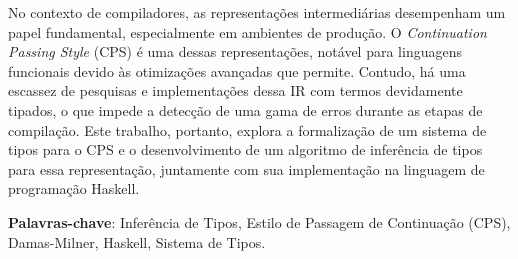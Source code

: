 
\setlength{\absparsep}{18pt}    %
\begin{resumo}
  No contexto de compiladores, as representações intermediárias desempenham um papel fundamental, especialmente em ambientes de produção.
  O \textit{Continuation Passing Style} (CPS) é uma dessas representações, notável para linguagens funcionais devido às otimizações avançadas que permite.
  Contudo, há uma escassez de pesquisas e implementações dessa IR com termos devidamente tipados, o que impede a detecção de uma gama de erros durante as etapas de compilação.
  Este trabalho, portanto, explora a formalização de um sistema de tipos para o CPS e o desenvolvimento de um algoritmo de inferência de tipos para essa representação, juntamente com sua implementação na linguagem de programação Haskell. 
  
  \textbf{Palavras-chave}: Inferência de Tipos, Estilo de Passagem de Continuação (CPS), Damas-Milner, Haskell, Sistema de Tipos.
\end{resumo}
